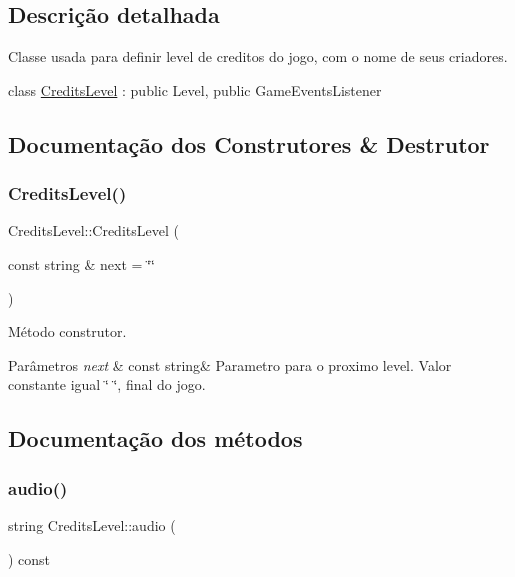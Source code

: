 \subsection{Descrição detalhada}
Classe usada para definir level de creditos do jogo, com o nome de seus criadores. 

class \mbox{\hyperlink{classCreditsLevel}{Credits\+Level}} \+: public Level, public Game\+Events\+Listener 

\subsection{Documentação dos Construtores \& Destrutor}
\mbox{\label{classCreditsLevel_a2516ba82d10b2eb959d03eea3df0a32c}} 
\subsubsection{\texorpdfstring{Credits\+Level()}{CreditsLevel()}}
{\footnotesize\ttfamily Credits\+Level\+::\+Credits\+Level (\begin{DoxyParamCaption}\item[{const string \&}]{next = {\ttfamily \char`\"{}\char`\"{}} }\end{DoxyParamCaption})}



Método construtor. 


\begin{DoxyParams}{Parâmetros}
{\em next} & const string\& Parametro para o proximo level. Valor constante igual \char`\"{} \char`\"{}, final do jogo. \\
\hline
\end{DoxyParams}


\subsection{Documentação dos métodos}
\mbox{\label{classCreditsLevel_a6bf8924562bb2ce7f8b85c35a9b8a52e}} 
\subsubsection{\texorpdfstring{audio()}{audio()}}
{\footnotesize\ttfamily string Credits\+Level\+::audio (\begin{DoxyParamCaption}{ }\end{DoxyParamCaption}) const}



